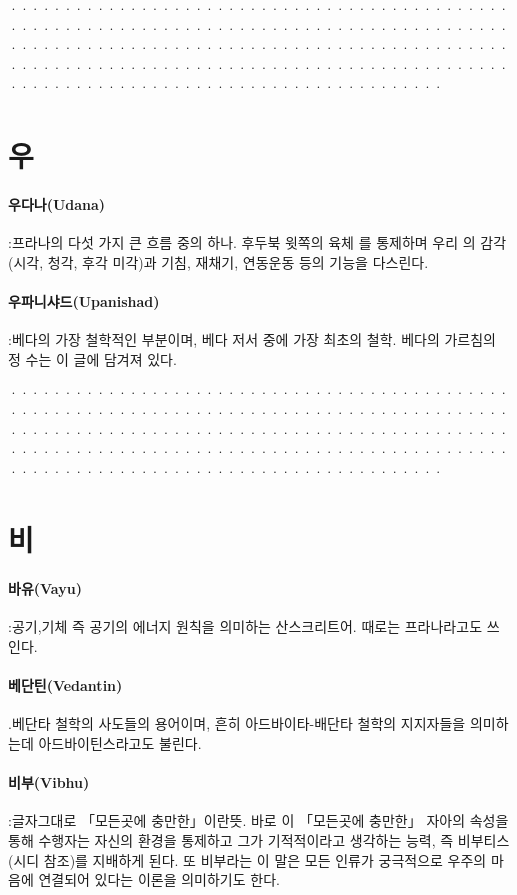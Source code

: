 \documentclass[12pt, a4paper, oneside]{book}
\let\stdsection\section
\renewcommand\section{\newpage\stdsection}
\begin{document}
································································································································································································································
\newpage
\section{우}

\paragraph{우다나(Udana)} :프라나의 다섯 가지 큰 흐름 중의 하나. 후두북 윗쪽의 육체 를 통제하며 우리 의 감각 (시각, 청각, 후각 미각)과 기침, 재채기, 연동운동 등의 기능을 다스린다.

\paragraph{우파니샤드(Upanishad)} :베다의 가장 철학적인 부분이며, 베다 저서 중에 가장 최초의 철학. 베다의 가르침의 정 수는 이 글에 담겨져 있다.

································································································································································································································

\newpage
\section{비}

\paragraph{바유(Vayu)} :공기,기체 즉 공기의 에너지 원칙을 의미하는 산스크리트어. 때로는 프라나라고도 쓰인다.

\paragraph{베단틴(Vedantin)} .베단타 철학의 사도들의 용어이며, 흔히 아드바이타-배단타 철학의 지지자들을 의미하는데 아드바이틴스라고도 불린다.

\paragraph{비부(Vibhu)} :글자그대로 「모든곳에 충만한」이란뜻. 바로 이 「모든곳에 충만한」 자아의 속성을 통해 수행자는 자신의 환경을 통제하고 그가 기적적이라고 생각하는 능력,  즉 비부티스(시디 참조)를 지배하게 된다. 또 비부라는 이 말은 모든 인류가 궁극적으로 우주의 마음에 연결되어 있다는 이론을 의미하기도 한다.
\end{document}
